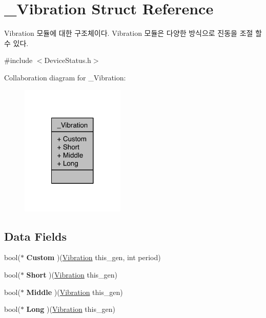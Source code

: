 \hypertarget{struct__Vibration}{\section{\-\_\-\-Vibration Struct Reference}
\label{struct__Vibration}
}


Vibration 모듈에 대한 구조체이다. Vibration 모듈은 다양한 방식으로 진동을 조절 할 수 있다.  




{\ttfamily \#include $<$Device\-Status.\-h$>$}



Collaboration diagram for \-\_\-\-Vibration\-:\nopagebreak
\begin{figure}[H]
\begin{center}
\leavevmode
\includegraphics[width=140pt]{d6/d45/struct__Vibration__coll__graph}
\end{center}
\end{figure}
\subsection*{Data Fields}
\begin{DoxyCompactItemize}
\item 
\hypertarget{struct__Vibration_a1e609bae048cc8d21ad4e2eb03dc70d2}{bool($\ast$ {\bfseries Custom} )(\hyperlink{struct__Vibration}{Vibration} this\-\_\-gen, int period)}\label{struct__Vibration_a1e609bae048cc8d21ad4e2eb03dc70d2}

\item 
\hypertarget{struct__Vibration_a6df62054739bf6fdb04f6014b5a721b3}{bool($\ast$ {\bfseries Short} )(\hyperlink{struct__Vibration}{Vibration} this\-\_\-gen)}\label{struct__Vibration_a6df62054739bf6fdb04f6014b5a721b3}

\item 
\hypertarget{struct__Vibration_a524fb3aaeea4a2f0fc1b15127621de0f}{bool($\ast$ {\bfseries Middle} )(\hyperlink{struct__Vibration}{Vibration} this\-\_\-gen)}\label{struct__Vibration_a524fb3aaeea4a2f0fc1b15127621de0f}

\item 
\hypertarget{struct__Vibration_a919f62ebeb930afff1a6f150b25130d2}{bool($\ast$ {\bfseries Long} )(\hyperlink{struct__Vibration}{Vibration} this\-\_\-gen)}\label{struct__Vibration_a919f62ebeb930afff1a6f150b25130d2}

\end{DoxyCompactItemize}



